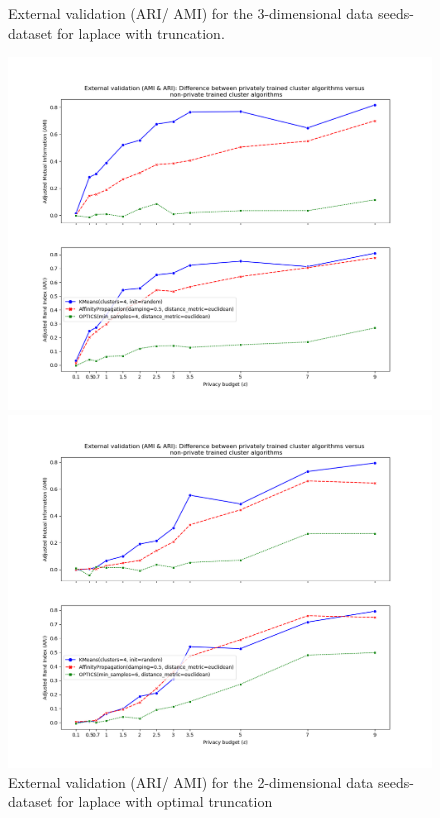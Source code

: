 {\begin{figure}[H]
\begin{minipage}[c]{0.49\textwidth}
            \caption{External validation (ARI/ AMI) for the 3-dimensional data seeds-dataset for laplace with truncation.}
            \label{fig:appendix-external-validation-seeds-dataset_comparison_3d-laplace-truncated}
        \end{minipage}
        \begin{minipage}[c]{0.49\textwidth}
            \includegraphics[width=1\textwidth]{Results/2d-laplace-optimal-truncated/seeds-dataset/ami-and-ari.png}
            \caption{External validation (ARI/ AMI) for the 2-dimensional data seeds-dataset for laplace with optimal truncation}
            \label{fig:appendix-external-validation-seeds-dataset_comparison_3d-laplace-optimal-truncated}
        \end{minipage}
        \begin{minipage}[c]{0.49\textwidth}
            \includegraphics[width=1\textwidth]{Results/3d-piecewise/seeds-dataset/ami-and-ari.png}

\end{minipage}
\end{figure}}
